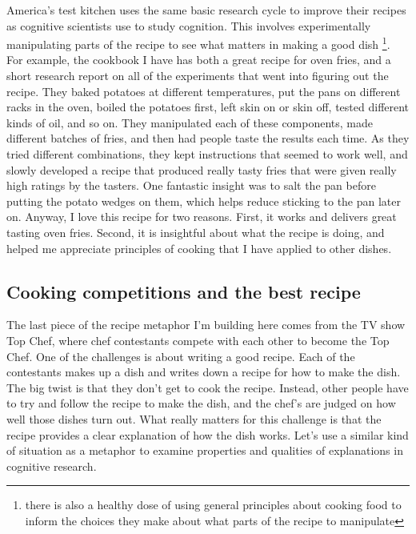 \documentclass[
  oneside,
  12pt]{crumpbook}
\begin{document}
America's test kitchen uses the same basic research cycle to improve their recipes as cognitive scientists use to study cognition. This involves experimentally manipulating parts of the recipe to see what matters in making a good dish \footnote{there is also a healthy dose of using general principles about cooking food to inform the choices they make about what parts of the recipe to manipulate}. For example, the cookbook I have has both a great recipe for oven fries, and a short research report on all of the experiments that went into figuring out the recipe. They baked potatoes at different temperatures, put the pans on different racks in the oven, boiled the potatoes first, left skin on or skin off, tested different kinds of oil, and so on. They manipulated each of these components, made different batches of fries, and then had people taste the results each time. As they tried different combinations, they kept instructions that seemed to work well, and slowly developed a recipe that produced really tasty fries that were given really high ratings by the tasters. One fantastic insight was to salt the pan before putting the potato wedges on them, which helps reduce sticking to the pan later on. Anyway, I love this recipe for two reasons. First, it works and delivers great tasting oven fries. Second, it is insightful about what the recipe is doing, and helped me appreciate principles of cooking that I have applied to other dishes.

\hypertarget{cooking-competitions-and-the-best-recipe}{%
\subsection{Cooking competitions and the best recipe}\label{cooking-competitions-and-the-best-recipe}}

The last piece of the recipe metaphor I'm building here comes from the TV show Top Chef, where chef contestants compete with each other to become the Top Chef. One of the challenges is about writing a good recipe. Each of the contestants makes up a dish and writes down a recipe for how to make the dish. The big twist is that they don't get to cook the recipe. Instead, other people have to try and follow the recipe to make the dish, and the chef's are judged on how well those dishes turn out. What really matters for this challenge is that the recipe provides a clear explanation of how the dish works. Let's use a similar kind of situation as a metaphor to examine properties and qualities of explanations in cognitive research.
\end{document}
